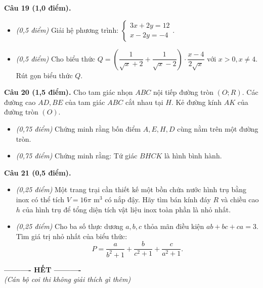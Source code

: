 \documentclass[11pt,a4paper]{article}
\begin{document}
\vspace{2mm}
\textbf{Câu 19 (1,0 điểm).}
\begin{itemize}
  \item[a)] \textit{(0,5 điểm)} Giải hệ phương trình: $\begin{cases} 3x + 2y = 12 \\ x - 2y = -4 \end{cases}$.
  \item[b)] \textit{(0,5 điểm)} Cho biểu thức $Q = \left( \dfrac{1}{\sqrt{x}+2} + \dfrac{1}{\sqrt{x}-2} \right) \cdot \dfrac{x - 4}{2\sqrt{x}}$ với $x > 0, x \ne 4$. Rút gọn biểu thức $Q$.
\end{itemize}

\vspace{2mm}
\textbf{Câu 20 (1,5 điểm).} Cho tam giác nhọn $ABC$ nội tiếp đường tròn $(O; R)$. Các đường cao $AD, BE$ của tam giác $ABC$ cắt nhau tại $H$. Kẻ đường kính $AK$ của đường tròn $(O)$.
\begin{itemize}
  \item[a)] \textit{(0,75 điểm)} Chứng minh rằng bốn điểm $A, E, H, D$ cùng nằm trên một đường tròn.
  \item[b)] \textit{(0,75 điểm)} Chứng minh rằng: Tứ giác $BHCK$ là hình bình hành.
\end{itemize}

\vspace{2mm}
\textbf{Câu 21 (0,5 điểm).}
\begin{itemize}
  \item[a)] \textit{(0,25 điểm)} Một trang trại cần thiết kế một bồn chứa nước hình trụ bằng inox có thể tích $V = 16\pi\text{ m}^3$ có nắp đậy. Hãy tìm bán kính đáy $R$ và chiều cao $h$ của hình trụ để tổng diện tích vật liệu inox toàn phần là nhỏ nhất.
  \item[b)] \textit{(0,25 điểm)} Cho ba số thực dương $a, b, c$ thỏa mãn điều kiện $ab + bc + ca = 3$. Tìm giá trị nhỏ nhất của biểu thức:
  \[
  P = \dfrac{a}{b^2 + 1} + \dfrac{b}{c^2 + 1} + \dfrac{c}{a^2 + 1}.
  \]
\end{itemize}

\vspace{4mm}
\begin{center}
\textbf{---------- HẾT ----------}\\
\textit{(Cán bộ coi thi không giải thích gì thêm)}
\end{center}
\end{document}

